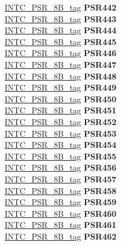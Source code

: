 \begin{DoxyCompactItemize}
\begin{tabbing}
\>\>\mbox{\hyperlink{unionINTC__PSR__8B__tag}{INTC\_PSR\_8B\_tag}} {\bfseries PSR442}\\
\>\>\mbox{\hyperlink{unionINTC__PSR__8B__tag}{INTC\_PSR\_8B\_tag}} {\bfseries PSR443}\\
\>\>\mbox{\hyperlink{unionINTC__PSR__8B__tag}{INTC\_PSR\_8B\_tag}} {\bfseries PSR444}\\
\>\>\mbox{\hyperlink{unionINTC__PSR__8B__tag}{INTC\_PSR\_8B\_tag}} {\bfseries PSR445}\\
\>\>\mbox{\hyperlink{unionINTC__PSR__8B__tag}{INTC\_PSR\_8B\_tag}} {\bfseries PSR446}\\
\>\>\mbox{\hyperlink{unionINTC__PSR__8B__tag}{INTC\_PSR\_8B\_tag}} {\bfseries PSR447}\\
\>\>\mbox{\hyperlink{unionINTC__PSR__8B__tag}{INTC\_PSR\_8B\_tag}} {\bfseries PSR448}\\
\>\>\mbox{\hyperlink{unionINTC__PSR__8B__tag}{INTC\_PSR\_8B\_tag}} {\bfseries PSR449}\\
\>\>\mbox{\hyperlink{unionINTC__PSR__8B__tag}{INTC\_PSR\_8B\_tag}} {\bfseries PSR450}\\
\>\>\mbox{\hyperlink{unionINTC__PSR__8B__tag}{INTC\_PSR\_8B\_tag}} {\bfseries PSR451}\\
\>\>\mbox{\hyperlink{unionINTC__PSR__8B__tag}{INTC\_PSR\_8B\_tag}} {\bfseries PSR452}\\
\>\>\mbox{\hyperlink{unionINTC__PSR__8B__tag}{INTC\_PSR\_8B\_tag}} {\bfseries PSR453}\\
\>\>\mbox{\hyperlink{unionINTC__PSR__8B__tag}{INTC\_PSR\_8B\_tag}} {\bfseries PSR454}\\
\>\>\mbox{\hyperlink{unionINTC__PSR__8B__tag}{INTC\_PSR\_8B\_tag}} {\bfseries PSR455}\\
\>\>\mbox{\hyperlink{unionINTC__PSR__8B__tag}{INTC\_PSR\_8B\_tag}} {\bfseries PSR456}\\
\>\>\mbox{\hyperlink{unionINTC__PSR__8B__tag}{INTC\_PSR\_8B\_tag}} {\bfseries PSR457}\\
\>\>\mbox{\hyperlink{unionINTC__PSR__8B__tag}{INTC\_PSR\_8B\_tag}} {\bfseries PSR458}\\
\>\>\mbox{\hyperlink{unionINTC__PSR__8B__tag}{INTC\_PSR\_8B\_tag}} {\bfseries PSR459}\\
\>\>\mbox{\hyperlink{unionINTC__PSR__8B__tag}{INTC\_PSR\_8B\_tag}} {\bfseries PSR460}\\
\>\>\mbox{\hyperlink{unionINTC__PSR__8B__tag}{INTC\_PSR\_8B\_tag}} {\bfseries PSR461}\\
\>\>\mbox{\hyperlink{unionINTC__PSR__8B__tag}{INTC\_PSR\_8B\_tag}} {\bfseries PSR462}\\

\end{tabbing}
\end{DoxyCompactItemize}
